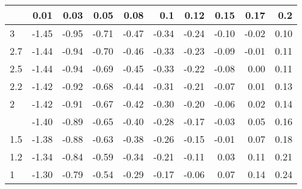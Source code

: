 
\begin{tabular}{lrrrrrrrrr}
\toprule
  & 0.01 & 0.03 & 0.05 & 0.08 & 0.1 & 0.12 & 0.15 & 0.17 & 0.2\\
\midrule
3 & -1.45 & -0.95 & -0.71 & -0.47 & -0.34 & -0.24 & -0.10 & -0.02 & 0.10\\
2.7 & -1.44 & -0.94 & -0.70 & -0.46 & -0.33 & -0.23 & -0.09 & -0.01 & 0.11\\
2.5 & -1.44 & -0.94 & -0.69 & -0.45 & -0.33 & -0.22 & -0.08 & 0.00 & 0.11\\
2.2 & -1.42 & -0.92 & -0.68 & -0.44 & -0.31 & -0.21 & -0.07 & 0.01 & 0.13\\
2 & -1.42 & -0.91 & -0.67 & -0.42 & -0.30 & -0.20 & -0.06 & 0.02 & 0.14\\
\addlinespace
1.7 & -1.40 & -0.89 & -0.65 & -0.40 & -0.28 & -0.17 & -0.03 & 0.05 & 0.16\\
1.5 & -1.38 & -0.88 & -0.63 & -0.38 & -0.26 & -0.15 & -0.01 & 0.07 & 0.18\\
1.2 & -1.34 & -0.84 & -0.59 & -0.34 & -0.21 & -0.11 & 0.03 & 0.11 & 0.21\\
1 & -1.30 & -0.79 & -0.54 & -0.29 & -0.17 & -0.06 & 0.07 & 0.14 & 0.24\\
\bottomrule
\end{tabular}
